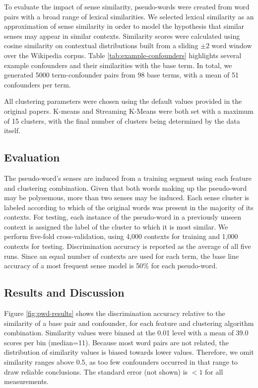 \documentclass[11pt]{article}
\begin{document}
To evaluate the impact of sense similarity, pseudo-words were created from word
pairs with a broad range of lexical similarities.  We selected lexical
similarity as an approximation of sense similarity in order to model the
hypothesis that similar senses may appear in similar contexts.
Similarity scores were calculated using cosine similarity on contextual
distributions built from a sliding $\pm2$ word window over the Wikipedia corpus.
Table \ref{tab:example-confounders} highlights several example confounders and
their similarities with the base term.  In total, we generated 5000
term-confounder pairs from 98 base terms, with a mean of 51 confounders per
term.

All clustering parameters were chosen using the default values provided in the
original papers. K-means and Streaming K-Means were both set with a maximum of
15 clusters, with the final number of clusters being determined by the data
itself.


\subsection{Evaluation}

The pseudo-word's senses are induced from a training segment using each feature
and clustering combination.  
%
Given that both words making up the pseudo-word may be polysemous, more than two
senses may be induced.
%
Each sense cluster is labeled according to which of the original words was
present in the majority of its contexts. For testing, each instance of the
pseudo-word in a previously unseen context is assigned the label of the cluster
to which it is most similar.  We perform five-fold cross-validation, using 4,000
contexts for training and 1,000 contexts for testing.  Discrimination accuracy
is reported as the average of all five runs.  Since an equal number of contexts
are used for each term, the base line accuracy of a most frequent sense model is
50\% for each pseudo-word.

\subsection{Results and Discussion}

Figure \ref{fig:pwd-results} shows the discrimination accuracy relative to the
similarity of a base pair and confounder, for each feature and clustering
algorithm combination.  Similarity values were binned at the 0.01 level with a
mean of 39.0 scores per bin
(median=11).  Because most word pairs are not related, the
  distribution of similarity values is biased towards lower values.  
Therefore, we omit similarity ranges above 0.5, as too few confounders occurred
in that range to draw reliable conclusions.  The standard error (not shown) is
$< 1$ for all measurements.
\end{document}
